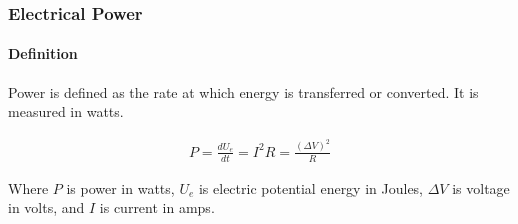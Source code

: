 \subsubsection*{Electrical Power}


\paragraph*{Definition}
Power is defined as the rate at which energy is transferred or converted. It is measured in watts.

\begin{align*}
    P = \frac{dU_e}{dt} = I^2R = \frac{(\Delta V)^2}{R}
\end{align*}

Where $P$ is power in watts, $U_e$ is electric potential energy in Joules, $\Delta V$ is voltage in volts, and $I$ is current in amps.

